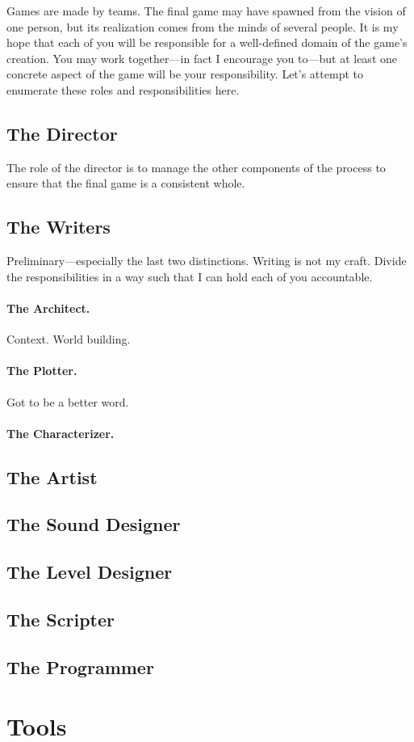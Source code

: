 \documentclass{article}
\begin{document}
Games are made by teams. The final game may have spawned from the vision of one person, but its realization comes from the minds of several people. It is my hope that each of you will be responsible for a well-defined domain of the game's creation. You may work together---in fact I encourage you to---but at least one concrete aspect of the game will be your responsibility. Let's attempt to enumerate these roles and responsibilities here.

\subsection*{The Director}
The role of the director is to manage the other components of the process to ensure that the final game is a consistent whole.

\subsection*{The Writers}
Preliminary---especially the last two distinctions. Writing is not my craft. Divide the responsibilities in a way such that I can hold each of you accountable.

\paragraph{The Architect.}
Context. World building.

\paragraph{The Plotter.}
Got to be a better word.

\paragraph{The Characterizer.}

\subsection*{The Artist}

\subsection*{The Sound Designer}

\subsection*{The Level Designer}

\subsection*{The Scripter}

\subsection*{The Programmer}

\section{Tools}
\end{document}
